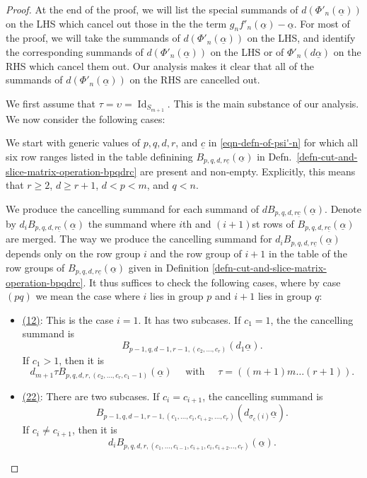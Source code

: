 \documentclass[12pt,a4paper,reqno]{amsart}
\DeclareMathOperator{\id}{Id}
\begin{document}
\begin{proof}
At the end of the proof, we will list the special summands of 
$d(\Phi'_n(\underline{\alpha}))$ on the LHS which cancel out 
those in the the term  $g_nf'_n(\underline{\alpha}) -
\underline{\alpha}$. For most of the proof, we will take 
the summands of $d(\Phi'_n(\underline{\alpha}))$ on the LHS, and 
identify the corresponding summands of 
$d(\Phi'_n(\underline{\alpha}))$ on the LHS or of 
$\Phi'_n(d \underline{\alpha})$ on the RHS which cancel them out.  
Our analysis makes it clear that all of the summands 
of $d(\Phi'_n(\underline{\alpha}))$ on the RHS 
are cancelled out. 

We first assume that $\tau = \upsilon = \id_{S_{m+1}}$. This is the
main substance of our analysis. We now consider the following cases: 


We start with generic values of $p, q, d, r$, and $\underline{c}$
in \eqref{eqn-defn-of-psi'-n} for which all six row
ranges listed in the table definining $B_{p, q, d, r
\underline{c}}(\underline{\alpha})$ in
Defn.~\ref{defn-cut-and-slice-matrix-operation-bpqdrc} are present and
non-empty. Explicitly, this means that $r \geq 2$, $d \geq r+1$, 
$d < p < m$, and $q < n$. 

We produce the cancelling summand for each summand of
$d B_{p, q, d, r \underline{c}}(\underline{\alpha})$. 
Denote by $d_i B_{p, q, d, r \underline{c}}(\underline{\alpha})$
the summand where $i$th and $(i+1)$st rows of
$B_{p, q, d, r \underline{c}}(\underline{\alpha})$ are merged.  
The way we produce the cancelling summand for 
$d_i B_{p, q, d, r \underline{c}}(\underline{\alpha})$
depends only on the row group $i$ and the row group of $i+1$ 
in the table of the row groups of 
$B_{p, q, d, r \underline{c}}(\underline{\alpha})$
given in Definition
\ref{defn-cut-and-slice-matrix-operation-bpqdrc}. 
It thus suffices to check the following cases, where by
case $(pq)$ we mean the case where $i$ lies in group $p$
and $i+1$ lies in group $q$:
\begin{itemize}
\item \underline{(12)}: This is the case $i = 1$. It has  
two subcases. If $c_1 = 1$, the 
the cancelling summand is  
$$B_{p-1, q, d-1, r-1,(c_2, \dots, c_r)}(d_1 \underline{\alpha}).$$
If $c_1 > 1$, then it is 
$$
d_{m+1} \tau B_{p, q, d, r, (c_2, \dots, c_r, c_1 - 1)}(\underline{\alpha})
\quad \text{ with } \quad \tau = \left((m+1)m\dots(r+1)\right).$$

\item \underline{(22)}: There are two subcases. If $c_i =
c_{i+1}$, the cancelling summand is 
$$B_{p-1, q, d-1, r-1,(c_1, \dots, c_{i}, c_{i+2}, \dots,
c_r)}(d_{\sigma_{\underline{c}}(i)} \underline{\alpha}).$$ 
If $c_i \neq c_{i+1}$, then it is 
$$d_{i} B_{p, q, d, r,(c_1, \dots, c_{i-1},
c_{i+1}, c_{i}, c_{i+2} \dots, c_r)} (\underline{\alpha}).$$ 


\end{itemize}
\end{proof}
\end{document}
